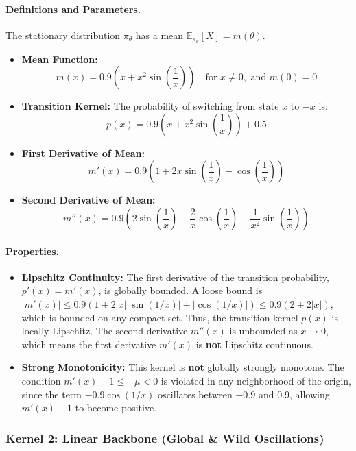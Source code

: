 \documentclass[a4paper]{article}
\begin{document}
\paragraph{Definitions and Parameters.}
The stationary distribution $\pi_\theta$ has a mean $\mathbb{E}_{\pi_\theta}[X] = m(\theta)$.
\begin{itemize}
	\item \textbf{Mean Function:}
	\[ m(x) = 0.9 \left( x + x^2 \sin\left(\frac{1}{x}\right) \right) \quad \text{for } x \neq 0, \text{ and } m(0)=0 \]
	\item \textbf{Transition Kernel:} The probability of switching from state $x$ to $-x$ is:
	\[ p(x) = 0.9 \left( x + x^2 \sin\left(\frac{1}{x}\right) \right) + 0.5 \]
	\item \textbf{First Derivative of Mean:}
	\[ m'(x) = 0.9 \left( 1 + 2x\sin\left(\frac{1}{x}\right) - \cos\left(\frac{1}{x}\right) \right) \]
	\item \textbf{Second Derivative of Mean:}
	\[ m''(x) = 0.9 \left( 2\sin\left(\frac{1}{x}\right) - \frac{2}{x}\cos\left(\frac{1}{x}\right) - \frac{1}{x^2}\sin\left(\frac{1}{x}\right) \right) \]
\end{itemize}

\paragraph{Properties.}
\begin{itemize}
	\item \textbf{Lipschitz Continuity:} The first derivative of the transition probability, $p'(x) = m'(x)$, is globally bounded. A loose bound is $|m'(x)| \le 0.9(1 + 2|x||\sin(1/x)| + |\cos(1/x)|) \le 0.9(2+2|x|)$, which is bounded on any compact set. Thus, the transition kernel $p(x)$ is locally Lipschitz. The second derivative $m''(x)$ is unbounded as $x \to 0$, which means the first derivative $m'(x)$ is \textbf{not} Lipschitz continuous.
	\item \textbf{Strong Monotonicity:} This kernel is \textbf{not} globally strongly monotone. The condition $m'(x) - 1 \le -\mu < 0$ is violated in any neighborhood of the origin, since the term $-0.9\cos(1/x)$ oscillates between $-0.9$ and $0.9$, allowing $m'(x)-1$ to become positive.
\end{itemize}

\subsubsection*{Kernel 2: Linear Backbone (Global \& Wild Oscillations)}
\end{document}
